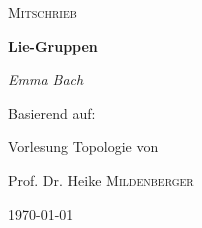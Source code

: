 \begin{titlepage}
	\centering
	{\Large \textsc{Mitschrieb}\par}
	\vspace{0.5cm}
	{\huge\bfseries Lie-Gruppen\par}
    \vspace{0.5cm}
	{\Large\itshape Emma Bach\par}
	\vfill
	
	Basierend auf:\par 
	\vspace{1cm}
	Vorlesung Topologie von\par
	Prof. Dr. Heike  \textsc{Mildenberger}\par
	
	\vfill

	{\large \today\par}
\end{titlepage}
